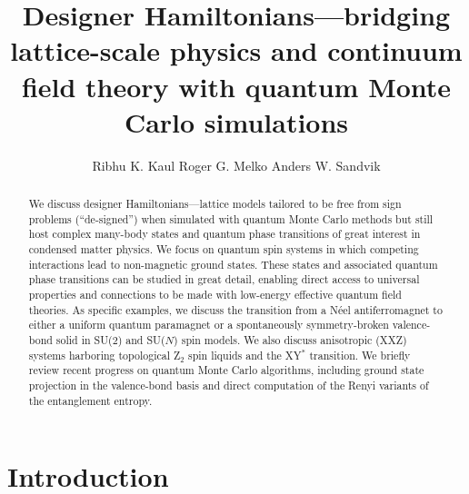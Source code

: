 \documentclass[range]{ar2e}
\begin{document}




\title{Designer Hamiltonians---bridging lattice-scale physics and continuum field theory with 
quantum Monte Carlo simulations} 

\author{Ribhu K. Kaul
Roger G. Melko
Anders W. Sandvik
}

\begin{abstract}
We discuss designer Hamiltonians---lattice models tailored to be free from sign problems (``de-signed'') when simulated with quantum 
Monte Carlo methods but still host complex  many-body states and quantum phase transitions of great interest in condensed matter 
physics. We focus on quantum spin systems in which competing interactions lead to non-magnetic ground states. These states and 
associated quantum phase transitions can be studied in great detail, enabling direct access to universal properties and connections 
to be made with low-energy effective quantum field theories. As specific examples, we discuss the transition from a N\'eel antiferromagnet to 
either a uniform quantum paramagnet or a spontaneously symmetry-broken valence-bond solid in SU($2$) and SU($N$) spin models. We also 
discuss anisotropic (XXZ) systems harboring topological Z$_2$ spin liquids and the XY$^*$ transition. We briefly review recent progress 
on quantum Monte Carlo algorithms, including ground state projection in the valence-bond basis and direct computation of the Renyi variants of the 
entanglement entropy.
\end{abstract}

\maketitle

\section{Introduction}
\label{sec:intro}
\end{document}
